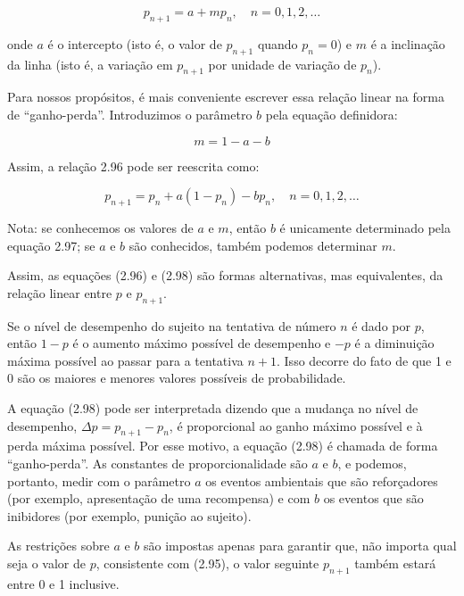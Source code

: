 \documentclass{article}
\begin{document}
\begin{equation}
p_{n+1} = a + m p_n, \quad n = 0, 1, 2, \ldots
\tag{2.96}
\end{equation}

onde $a$ é o intercepto (isto é, o valor de $p_{n+1}$ quando $p_n = 0$) e $m$ é a inclinação da linha (isto é, a variação em $p_{n+1}$ por unidade de variação de $p_n$).

Para nossos propósitos, é mais conveniente escrever essa relação linear na forma de ``ganho-perda''. Introduzimos o parâmetro $b$ pela equação definidora:

\begin{equation}
m = 1 - a - b
\tag{2.97}
\end{equation}

Assim, a relação 2.96 pode ser reescrita como:

\begin{equation}
p_{n+1} = p_n + a(1 - p_n) - b p_n, \quad n = 0, 1, 2, \ldots
\tag{2.98}
\end{equation}

\noindent
Nota: se conhecemos os valores de $a$ e $m$, então $b$ é unicamente determinado pela equação {2.97}; se $a$ e $b$ são conhecidos, também podemos determinar $m$.


Assim, as equações (2.96) e (2.98) são formas alternativas, mas equivalentes, da relação linear entre $p$ e $p_{n+1}$.

Se o nível de desempenho do sujeito na tentativa de número $n$ é dado por $p$, então $1 - p$ é o aumento máximo possível de desempenho e $-p$ é a diminuição máxima possível ao passar para a tentativa $n + 1$. Isso decorre do fato de que 1 e 0 são os maiores e menores valores possíveis de probabilidade. 

A equação (2.98) pode ser interpretada dizendo que a mudança no nível de desempenho, $\Delta p = p_{n+1} - p_n$, é proporcional ao ganho máximo possível e à perda máxima possível. Por esse motivo, a equação (2.98) é chamada de forma “ganho-perda”. As constantes de proporcionalidade são $a$ e $b$, e podemos, portanto, medir com o parâmetro $a$ os eventos ambientais que são reforçadores (por exemplo, apresentação de uma recompensa) e com $b$ os eventos que são inibidores (por exemplo, punição ao sujeito).

As restrições sobre $a$ e $b$ são impostas apenas para garantir que, não importa qual seja o valor de $p$, consistente com (2.95), o valor seguinte $p_{n+1}$ também estará entre 0 e 1 inclusive. 
\end{document}
